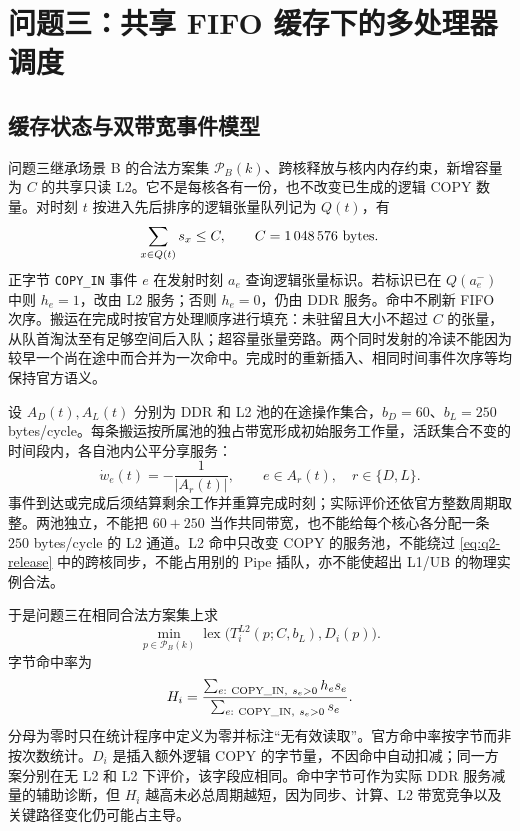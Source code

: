 \section{问题三：共享 FIFO 缓存下的多处理器调度}
\subsection{缓存状态与双带宽事件模型}
问题三继承场景 B 的合法方案集 $\mathcal P_B(k)$、跨核释放与核内内存约束，新增容量为 $C$ 的共享只读 L2。它不是每核各有一份，也不改变已生成的逻辑 COPY 数量。对时刻 $t$ 按进入先后排序的逻辑张量队列记为 $Q(t)$，有
\begin{equation}\label{eq:q3-capacity}
\sum_{x\in Q(t)}s_x\le C,\qquad C=1\,048\,576\ {\rm bytes}.
\end{equation}
正字节 \texttt{COPY\_IN} 事件 $e$ 在发射时刻 $a_e$ 查询逻辑张量标识。若标识已在 $Q(a_e^-)$ 中则 $h_e=1$，改由 L2 服务；否则 $h_e=0$，仍由 DDR 服务。命中不刷新 FIFO 次序。搬运在完成时按官方处理顺序进行填充：未驻留且大小不超过 $C$ 的张量，从队首淘汰至有足够空间后入队；超容量张量旁路。两个同时发射的冷读不能因为较早一个尚在途中而合并为一次命中。完成时的重新插入、相同时间事件次序等均保持官方语义。

设 $A_D(t),A_L(t)$ 分别为 DDR 和 L2 池的在途操作集合，$b_D=60$、$b_L=250$ bytes/cycle。每条搬运按所属池的独占带宽形成初始服务工作量，活跃集合不变的时间段内，各自池内公平分享服务：
\begin{equation}\label{eq:q3-service}
\dot w_e(t)=-\frac{1}{|A_r(t)|},\qquad
e\in A_r(t),\quad r\in\{D,L\}.
\end{equation}
事件到达或完成后须结算剩余工作并重算完成时刻；实际评价还依官方整数周期取整。两池独立，不能把 $60+250$ 当作共同带宽，也不能给每个核心各分配一条 $250$ bytes/cycle 的 L2 通道。L2 命中只改变 COPY 的服务池，不能绕过 \eqref{eq:q2-release} 中的跨核同步，不能占用别的 Pipe 插队，亦不能使超出 L1/UB 的物理实例合法。

于是问题三在相同合法方案集上求
\begin{equation}\label{eq:q3-objective}
\min_{p\in\mathcal P_B(k)}
\operatorname{lex}\bigl(T_i^{L2}(p;C,b_L),D_i(p)\bigr).
\end{equation}
字节命中率为
\begin{equation}\label{eq:q3-hit}
H_i=\frac{\sum_{e:\ {\rm COPY\_IN},\ s_e>0}h_es_e}
{\sum_{e:\ {\rm COPY\_IN},\ s_e>0}s_e}.
\end{equation}
分母为零时只在统计程序中定义为零并标注“无有效读取”。官方命中率按字节而非按次数统计。$D_i$ 是插入额外逻辑 COPY 的字节量，不因命中自动扣减；同一方案分别在无 L2 和 L2 下评价，该字段应相同。命中字节可作为实际 DDR 服务减量的辅助诊断，但 $H_i$ 越高未必总周期越短，因为同步、计算、L2 带宽竞争以及关键路径变化仍可能占主导。

